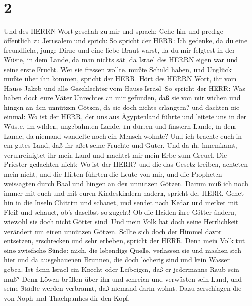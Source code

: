 \hypertarget{section-1}{%
\section{2}\label{section-1}}

 Und des HERRN Wort geschah zu mir und sprach: 
Gehe hin und predige öffentlich zu Jerusalem und sprich: So spricht der
HERR: Ich gedenke, da du eine freundliche, junge Dirne und eine liebe
Braut warst, da du mir folgtest in der Wüste, in dem Lande, da man
nichts sät,  da Israel des HERRN eigen war und seine erste
Frucht. Wer sie fressen wollte, mußte Schuld haben, und Unglück mußte
über ihn kommen, spricht der HERR.  Hört des HERRN Wort, ihr
vom Hause Jakob und alle Geschlechter vom Hause Israel.  So
spricht der HERR: Was haben doch eure Väter Unrechtes an mir gefunden,
daß sie von mir wichen und hingen an den unnützen Götzen, da sie doch
nichts erlangten?  und dachten nie einmal: Wo ist der HERR,
der uns aus Ägyptenland führte und leitete uns in der Wüste, im wilden,
ungebahnten Lande, im dürren und finstern Lande, in dem Lande, da
niemand wandelte noch ein Mensch wohnte?  Und ich brachte
euch in ein gutes Land, daß ihr äßet seine Früchte und Güter. Und da ihr
hineinkamt, verunreinigtet ihr mein Land und machtet mir mein Erbe zum
Greuel.  Die Priester gedachten nicht: Wo ist der HERR? und
die das Gesetz treiben, achteten mein nicht, und die Hirten führten die
Leute von mir, und die Propheten weissagten durch Baal und hingen an den
unnützen Götzen.  Darum muß ich noch immer mit euch und mit
euren Kindeskindern hadern, spricht der HERR.  Gehet hin in
die Inseln Chittim und schauet, und sendet nach Kedar und merket mit
Fleiß und schauet, ob's daselbst so zugeht!  Ob die Heiden
ihre Götter ändern, wiewohl sie doch nicht Götter sind! Und mein Volk
hat doch seine Herrlichkeit verändert um einen unnützen Götzen.
 Sollte sich doch der Himmel davor entsetzen, erschrecken
und sehr erbeben, spricht der HERR.  Denn mein Volk tut
eine zwiefache Sünde: mich, die lebendige Quelle, verlassen sie und
machen sich hier und da ausgehauenen Brunnen, die doch löcherig sind und
kein Wasser geben.  Ist denn Israel ein Knecht oder
Leibeigen, daß er jedermanns Raub sein muß?  Denn Löwen
brüllen über ihn und schreien und verwüsten sein Land, und seine Städte
werden verbrannt, daß niemand darin wohnt.  Dazu
zerschlagen die von Noph und Thachpanhes dir den Kopf. 
